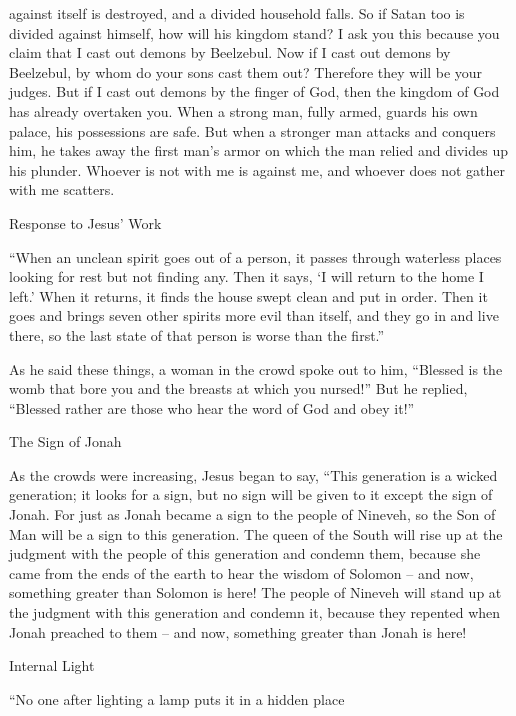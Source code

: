 {against
itself
is destroyed,
and
a divided household
falls.
So
if
Satan
too
is divided
against
himself,
how
will
his
kingdom
stand? I ask you this because
you claim
that I
cast out
demons
by
Beelzebul.
Now
if
I
cast out
demons
by
Beelzebul,
by
whom
do your
sons
cast
them out? Therefore
they will be
your
judges.
But
if
I
cast out
demons
by
the finger
of God,
then
the kingdom
of God
has already overtaken
you.
When
a strong man,
fully armed,
guards
his own
palace,
his
possessions
are
safe.
But
when
a stronger man
attacks
and conquers
him,
he takes away
the first man’s
armor
on
which
the man relied
and
divides up
his
plunder.
Whoever is
not
with
me
is
against
me,
and
whoever does
not
gather
with
me
scatters.
\par }{\SH Response to Jesus’ Work
\par }{\PP {}“When
an unclean
spirit
goes out
of
a person,
it passes
through
waterless
places
looking
for rest
but
not
finding
any. Then
it says,
‘I will return
to
the home
I
left.’
When it returns,
it finds
the house swept clean
and
put in order.
Then
it goes
and
brings
seven
other
spirits
more evil than
itself,
and
they go in
and live
there,
so the last
state of that
person
is
worse
than the first.”
\par }{\PP {}As he said
these things,
a woman
in the crowd
spoke out
to him,
“Blessed
is the womb
that bore
you
and
the breasts
at which
you nursed!”
But
he replied, “Blessed
rather
are those who hear
the word
of God
and
obey it!”
\par }{\SH The Sign of Jonah
\par }{\PP {}As the crowds
were increasing,
Jesus began
to say,
“This
generation
is
a wicked
generation;
it looks for
a sign,
but
no
sign
will be given
to it
except
the sign
of Jonah.
For
just as
Jonah
became
a sign
to the people of Nineveh,
so
the Son
of Man
will be
a sign to this
generation.
The queen
of the South
will rise up
at
the judgment
with
the people
of this
generation
and
condemn
them,
because
she came
from
the ends
of the earth
to hear
the wisdom
of Solomon
– and
now,
something greater than
Solomon
is here!
The people
of Nineveh
will stand up
at
the judgment
with
this
generation
and
condemn
it,
because
they repented
when Jonah
preached to them – and now, something greater than Jonah is here!
\par }{\SH Internal Light
\par }{\PP {}“No one
after lighting
a lamp
puts
it in
a hidden place
}
